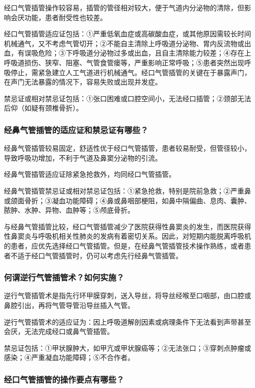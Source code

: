 经口气管插管操作较容易，插管的管径相对较大，便于气道内分泌物的清除，但影响会厌功能，患者耐受性也较差。

经口气管插管适应证包括：①严重低氧血症或高碳酸血症，或其他原因需较长时间机械通气，又不考虑气管切开；②不能自主清除上呼吸道分泌物、胃内反流物或出血，有误吸危险；③下呼吸道分泌物过多或出血，且自主清除能力较差；④存在上呼吸道损伤、狭窄、阻塞、气管食管瘘等，严重影响正常呼吸；⑤患者突然出现呼吸停止，需紧急建立人工气道进行机械通气。经口气管插管的关键在于暴露声门，在声门无法暴露的情况下，容易失败或出现并发症。

禁忌证或相对禁忌证包括：①张口困难或口腔空间小，无法经口插管；②颈部无法后仰（如疑有颈椎骨折）。

\subsubsection{经鼻气管插管的适应证和禁忌证有哪些？}

经鼻气管插管较易固定，舒适性优于经口气管插管，患者较易耐受，但管径较小，导致呼吸功增加，不利于气道及鼻窦分泌物的引流。

经鼻气管插管适应证除紧急抢救外，均同经口气管插管。

经鼻气管插管禁忌证或相对禁忌证包括：①紧急抢救，特别是院前急救；②严重鼻或颌面骨折；③凝血功能障碍；④鼻或鼻咽部梗阻，如鼻中隔偏曲、息肉、囊肿、脓肿、水肿、异物、血肿等；⑤颅底骨折。

与经鼻气管插管比较，经口气管插管减少了医院获得性鼻窦炎的发生，而医院获得性鼻窦炎与呼吸机相关性肺炎的发病有着密切关系。因此，对短期内能脱离呼吸机的患者，应优先选择经口气管插管。但是，在经鼻气管插管技术操作熟练，或者患者不适于经口气管插管时，仍可以考虑先行经鼻气管插管。

\subsubsection{何谓逆行气管插管术？如何实施？}

逆行气管插管术是指先行环甲膜穿刺，送入导丝，将导丝经喉至口咽部，由口腔或鼻腔引出，再将气管导管沿导丝插入气管。

逆行气管插管术的适应证为：因上呼吸道解剖因素或病理条件下无法看到声带甚至会厌，无法完成经口或鼻气管插管。

禁忌证包括：①甲状腺肿大，如甲亢或甲状腺癌等；②无法张口；③穿刺点肿瘤或感染；④严重凝血功能障碍；⑤不合作者。

\subsubsection{经口气管插管的操作要点有哪些？}

